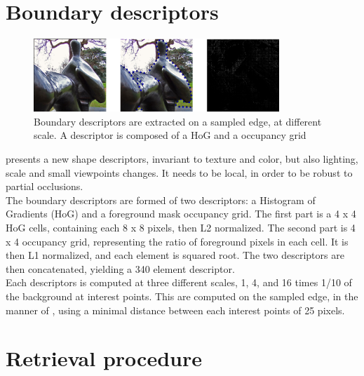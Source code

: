 \documentclass{article}
\begin{document}
\section{Boundary descriptors}

\begin{figure}

\label{boundary-descriptors}
\begin{center}
\includegraphics[width=350px]{images/desc.png}
\end{center}
\caption{Boundary descriptors are extracted on a sampled edge, at different
scale. A descriptor is composed of a HoG and a occupancy grid}
\end{figure}


\cite{Arandjelovic11} presents a new shape descriptors, invariant to texture
and color, but also lighting, scale and small viewpoints changes. It needs to
be local, in order to be robust to partial occlusions. \\
The boundary descriptors are formed of two descriptors: a Histogram of
Gradients (HoG) and a foreground mask occupancy grid. The first part is a
4 x 4 HoG cells, containing each 8 x 8 pixels, then L2 normalized. The second
part is 4 x 4 occupancy grid, representing the ratio of foreground pixels in
each cell. It is then L1 normalized, and each element is squared root. The two
descriptors are then concatenated, yielding a 340 element descriptor. \\
Each descriptors is computed at three different scales, 1, 4, and 16 times
1/10 of the background at interest points. This are computed  on the sampled
edge, in the manner of \cite{BelongieMP02}, using a minimal distance between
each interest points of 25 pixels.

\section{Retrieval procedure}
\end{document}
